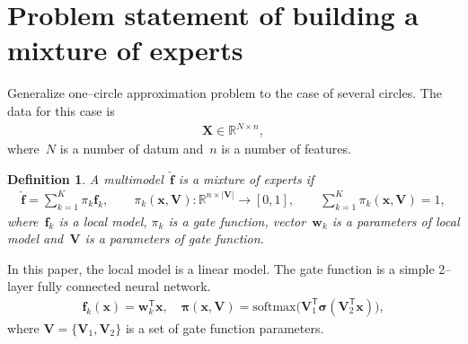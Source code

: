\documentclass[12pt, twoside]{article}
\newtheorem{definition}{Definition}[section]
\begin{document}
\section{Problem statement of building a mixture of experts}
Generalize one--circle approximation problem to the case of several circles.
The data for this case is
\[
\label{eq:st:1}
\begin{aligned}
\textbf{X} \in \mathbb{R}^{N \times n},
\end{aligned}
\]
where~$N$ is a number of datum and~$n$ is a number of features.
\begin{definition}
\label{def:1}
A multimodel~$\hat{\mathbf{f}}$ is a mixture of experts if
\[
\label{eq:st:2}
\begin{aligned}
\hat{\mathbf{f}} = \sum_{k=1}^{K}\pi_{k}\mathbf{f}_k, \qquad \pi_{k}\left(\mathbf{x}, \mathbf{V}\right):\mathbb{R}^{n\times \left|\mathbf{V}\right|} \to [0, 1], \qquad \sum_{k=1}^{K}\pi_{k}\left(\mathbf{x}, \mathbf{V}\right) = 1,
\end{aligned}
\]
where~$\mathbf{f}_k$ is a local model, $\pi_k$ is a gate function, vector~$\mathbf{w}_k$ is a parameters of local model and~$\mathbf{V}$ is a parameters of gate function.
\end{definition}

In this paper, the local model is a linear model. The gate function is a simple 2--layer fully connected neural network.
\[
\label{eq:st:3}
\begin{aligned}
\mathbf{f}_k\left(\textbf{x}\right) = \textbf{w}_k^{\mathsf{T}}\textbf{x}, \quad
\bm{\pi}\left(\mathbf{x}, \mathbf{V}\right) = \text{softmax}\bigr(\mathbf{V}_{1}^{\mathsf{T}}\bm{\sigma}\left(\mathbf{V}_2^{\mathsf{T}}\mathbf{x}\right)\bigr),
\end{aligned}
\]
where $\mathbf{V} = \bigr\{\mathbf{V}_1, \mathbf{V}_2\bigr\}$ is a set of gate function parameters.
\end{document}
